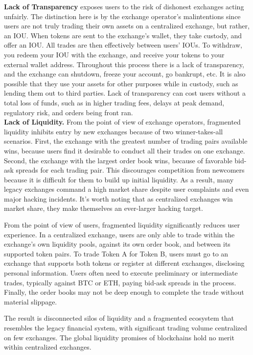 \documentclass[UTF8,nofonts]{article}
\begin{document}
\textbf{Lack of Transparency} exposes users to the risk of dishonest exchanges acting unfairly. The distinction here is by the exchange operator's malintentions since users are not truly trading their own assets on a centralized exchange, but rather, an IOU. When tokens are sent to the exchange's wallet, they take custody, and offer an IOU. All trades are then effectively between users' IOUs. To withdraw, you redeem your IOU with the exchange, and receive your tokens to your external wallet address. Throughout this process there is a lack of transparency, and the exchange can shutdown, freeze your account, go bankrupt, etc. It is also possible that they use your assets for other purposes while in custody, such as lending them out to third parties. Lack of transparency can cost users without a total loss of funds, such as in higher trading fees, delays at peak demand, regulatory risk, and orders being front ran.\\

\textbf{Lack of Liquidity.}
From the point of view of exchange operators, fragmented liquidity inhibits entry by new exchanges because of two winner-takes-all scenarios. First, the exchange with the greatest number of trading pairs available wins, because users find it desirable to conduct all their trades on one exchange. Second, the exchange with the largest order book wins, because of favorable bid-ask spreads for each trading pair. This discourages competition from newcomers because it is difficult for them to build up initial liquidity. As a result, many legacy exchanges command a high market share despite user complaints and even major hacking incidents. It's worth noting that as centralized exchanges win market share, they make themselves an ever-larger hacking target. 

From the point of view of users, fragmented liquidity significantly reduces user experience. In a centralized exchange, users are only able to trade within the exchange's own liquidity pools, against its own order book, and between its supported token pairs. To trade Token A for Token B, users must go to an exchange that supports both tokens or register at different exchanges, disclosing personal information. Users often need to execute preliminary or intermediate trades, typically against BTC or ETH, paying bid-ask spreads in the process. Finally, the order books may not be deep enough to complete the trade without material slippage.

The result is disconnected silos of liquidity and a fragmented ecosystem that resembles the legacy financial system, with significant trading volume centralized on few exchanges. The global liquidity promises of blockchains hold no merit within centralized exchanges.
\end{document}
